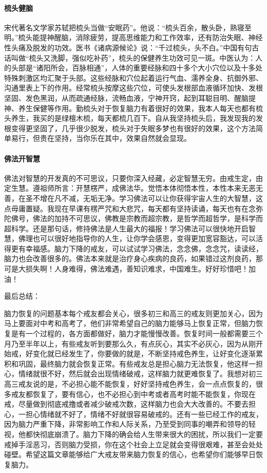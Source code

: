 \paragraph{梳头健脑} 宋代著名文学家苏轼把梳头当做“安眠药”。他说：“梳头百余，散头卧，熟寝至明。”梳头能提神醒脑，消除疲劳，提高思维能力和工作效率，还有防治失眠、神经性头痛及脱发的功效。医书《诸病源候论》说：“千过梳头，头不白。”中国有句古话叫做“梳头又洗脚，强似吃补药”，梳头的保健养生功效可见一斑。中医认为：人的头部是“诸阳所会，百脉相通”，人体的重要经脉和四十多个大小穴位以及十多处特殊刺激区均汇聚于头部。这些经脉和穴位起着运行气血、濡养全身、抗御外邪、沟通里表上下的作用。经常梳头按摩这些穴位，可使头发根部血液循环加快、发根坚固、发色黑润，从而疏通经脉，流畅血液，宁神开窍，起到耳聪目明、醒脑提神、养生保健等作用。勤梳头对于恢复脑力有着很好的效果，我本人每天也都有梳头养生，我买的是绿檀木梳，每天都梳几百下。自从我坚持梳头后，我发现我的发根变得更坚固了，几乎很少脱发，梳头对于失眠多梦也有很好的效果，这个方法简单易行，但贵在坚持，当你乐在其中，效果自然就会显现。

\paragraph{佛法开智慧} 佛法对智慧的开发真的不可思议，只要你深入经藏，必定智慧无穷。由戒生定，由定生慧。遵祖师所言：开慧楞严，成佛法华。觉悟本体彻悟本性，本性本来无恶无善，在圣不增在凡不减，无垢无净。学习佛法可以让你获得宇宙人生的大智慧，这点毋庸置疑。我现在早课有楞严咒和大悲咒，每天都有坚持读诵，每天也有在念弥陀佛号，佛法的加持不可思议，佛教是宗教而超宗教，是哲学而超哲学，是科学而超科学。还是那句话，修持佛法是人生最大的福报！学习佛法可以很快地开启智慧，佛理也可以很好地指导你的人生，让你学会感恩，变得更加宽容豁达，可以活得更有幸福感。脑力下降的戒友，可以试试学习佛法，念念佛，念念咒，读读经，脑力也会改善很多的。佛法本来就是治疗身心疾病的良药，如果错过这剂良药，那可是大损失啊！人身难得，佛法难遇，善知识难求，中国难生。好好珍惜吧！加油！

最后总结：

脑力恢复的问题基本每个戒友都会关心，很多初三和高三的戒友则更加关心，因为马上要面对中考和高考了，他们非常希望自己的脑力能够马上恢复正常，但脑力恢复是有一个过程的，各方面都做好，脑力才能慢慢改善。恢复时间一般都需要三个月乃至半年以上，有些戒友听到要那么久，有点灰心，其实不必灰心，因为从刚开始戒，好变化就已经发生了，你要做的就是，不断坚持戒色养生，让好变化逐渐累积和巩固，最终脑力就会恢复正常。有些戒友总是担心脑力无法恢复，他这样一担心，情绪就很不好，然后就会出现情绪破戒，这样脑力就更难恢复了。我想对初三高三戒友说的是，不必担心能不能恢复，好好坚持戒色养生，会一点点恢复的，很多戒友都恢复了，要有信心，也不必担心到中考或者高考时能不能恢复，你现在戒，尽量做到彻底戒撸或者减少破戒次数，这样脑力也会大大改善的。不要去担心，一担心情绪就不好了，情绪不好就很容易破戒的。还有一些已经工作的戒友，因为脑力严重下降，非常影响工作和人际关系，乃至受到同事的嘲弄和领导的轻视，他都快彻底崩溃了。脑力下降的确会给人生带来很大的困扰，所以我们一定要戒掉手淫恶习，否则脑力受损，你在这个社会上立足就会变得很艰难，甚至会处处碰壁。希望这篇文章能够给广大戒友带来脑力恢复的信心，也希望你们能够早日恢复脑力。

